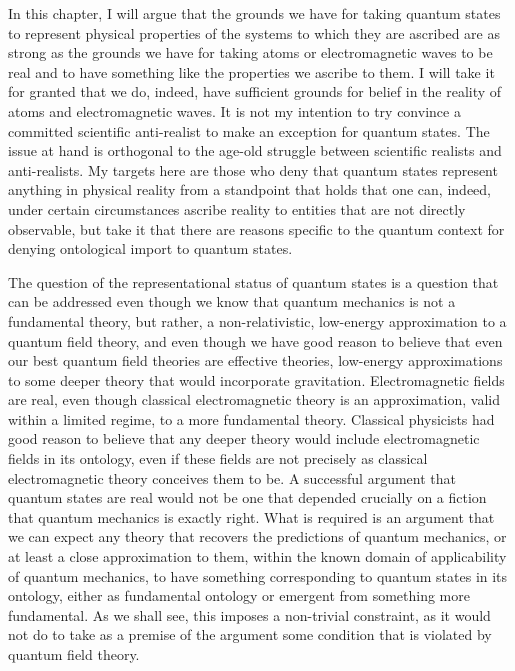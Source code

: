 \documentclass[12pt]{article}
\begin{document}
In this chapter, I will argue that the grounds we have for taking quantum states to represent physical properties of the systems to which they are ascribed are  as strong as the grounds we have for taking atoms or electromagnetic waves to be real and to have something like the properties we ascribe to them. I will take it for granted that we do, indeed, have sufficient grounds for belief in the reality of atoms and electromagnetic waves. It is not my intention to try convince a committed scientific anti-realist to make an exception for quantum states. The issue at hand is orthogonal to the age-old struggle between scientific realists and anti-realists.  My targets here are  those who deny that quantum states represent anything in physical reality  from a standpoint that holds  that one can, indeed, under certain circumstances ascribe reality to entities that are not directly observable, but  take it that there are  reasons specific to the quantum context for denying ontological import to quantum states.


The question of the representational status of quantum states  is a question that can be addressed even though we know  that quantum mechanics is not a fundamental theory, but rather, a non-relativistic, low-energy approximation to a quantum field theory, and even though we have good reason to believe that even our best quantum field theories are effective theories, low-energy approximations to some deeper theory that would incorporate gravitation.  Electromagnetic fields are real, even though classical electromagnetic theory is an approximation, valid within a limited regime, to a more fundamental theory.  Classical physicists had good reason to believe that any deeper theory would include electromagnetic fields in its ontology, even if these fields are not precisely as classical electromagnetic theory conceives them to be. A successful argument that quantum states are real would not be one that depended crucially on  a fiction that quantum mechanics is exactly right.   What is required is an argument that we can expect any theory that recovers the predictions of quantum mechanics, or at least a close approximation to them, within the known domain of applicability of quantum mechanics, to have something corresponding to quantum states in its ontology, either as fundamental ontology or emergent from something more fundamental. As we shall see, this imposes a non-trivial constraint, as it would not do to take as a premise of the argument some condition that is violated by quantum field theory.
\end{document}
